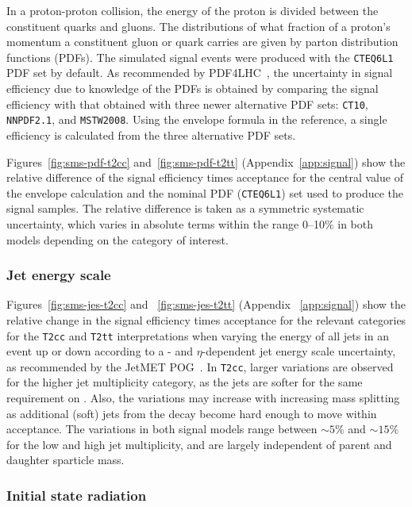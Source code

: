 In a proton-proton collision, the energy of the proton is divided between the constituent 
quarks and gluons. The distributions of what fraction of a proton's momentum a constituent gluon or 
quark carries are given by parton distribution functions (PDFs).
The simulated signal events were produced with the \verb!CTEQ6L1! PDF
set by default.  As recommended by PDF4LHC~\cite{pdf4lhc}, the uncertainty
in signal efficiency due to knowledge of the PDFs is obtained by comparing 
the signal efficiency with that obtained with three newer alternative PDF 
sets: \verb!CT10!, \verb!NNPDF2.1!, and \verb!MSTW2008!. Using the envelope
formula in the reference, a single efficiency is calculated from the three alternative
PDF sets. 

Figures~\ref{fig:sms-pdf-t2cc} and~\ref{fig:sms-pdf-t2tt} 
(Appendix~\ref{app:signal}) show the relative difference of the signal 
efficiency times acceptance for the central value of the envelope calculation 
and the nominal PDF (\verb!CTEQ6L1!) set used to produce the signal 
samples. The relative difference is taken as a symmetric systematic 
uncertainty, which varies in absolute terms within the range 0--10\% in 
both models depending on the category of interest.

\subsubsection{Jet energy scale\label{sec:sms-syst-jes}}

Figures~\ref{fig:sms-jes-t2cc} and ~\ref{fig:sms-jes-t2tt} 
(Appendix ~\ref{app:signal}) show the relative change in the 
signal efficiency times acceptance for the relevant categories for 
the \verb!T2cc! and \verb!T2tt! interpretations when varying the energy 
of all jets in an event up or down according to a \pt- and $\eta$-dependent 
jet energy scale uncertainty, as recommended by the JetMET POG~\cite{Chatrchyan:2011ds}. 
In \verb!T2cc!, larger variations are observed for the higher 
jet multiplicity category, as the jets are softer for the same 
requirement on \scalht. Also, the variations may increase with 
increasing mass splitting as additional (soft) jets from the decay 
become hard enough to move within acceptance. The variations in both 
signal models range between $\sim\!\!5\%$ and $\sim\!\!15\%$ for the low 
and high jet multiplicity, and are largely independent of parent 
and daughter sparticle mass. 

\subsubsection{Initial state radiation\label{sec:sms-syst-isr}}

